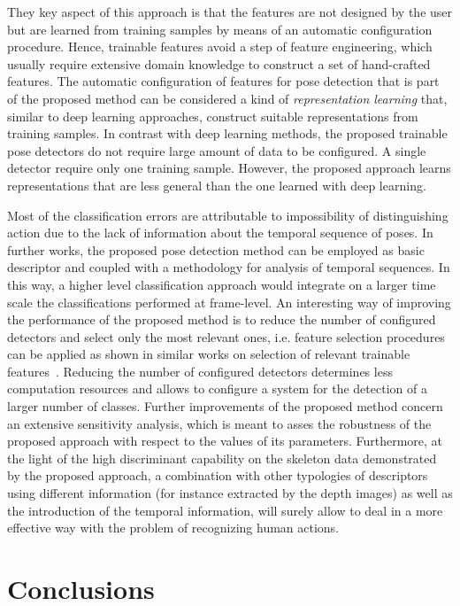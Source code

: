 \documentclass[runningheads,a4paper]{llncs}
\begin{document}
They key aspect of this approach is that the features are not designed by the user but are learned from training samples by means of an automatic configuration procedure. Hence, trainable features avoid a step of feature engineering, which usually require extensive domain knowledge to construct a set of hand-crafted features. The automatic configuration of features for pose detection that is part of the proposed method can be considered a kind of \emph{representation learning} that, similar to deep learning approaches, construct suitable representations from training samples.
In contrast with deep learning methods, the proposed trainable pose detectors do not require large amount of data to be configured. A single detector require only one training sample. However, the proposed approach learns representations that are less general than the one learned with deep learning.

Most of the classification errors are attributable to impossibility of distinguishing action due to the lack of information about the temporal sequence of poses. In further works, the proposed pose detection method can be employed as basic descriptor and coupled with a methodology for analysis of temporal sequences. In this way, a higher level classification approach would integrate on a larger time scale the classifications performed at frame-level.
An interesting way of improving the performance of the proposed method is to reduce the number of configured detectors and select only the most relevant ones, i.e. feature selection procedures can be applied as shown in similar works on selection of relevant trainable features~\cite{Strisciuglio15,Strisciuglio2016}. Reducing the number of configured detectors determines less computation resources and allows to configure a system for the detection of a larger number of classes.
Further improvements of the proposed method concern an extensive sensitivity analysis, which is meant to asses the robustness of the proposed approach with respect to the values of its  parameters. Furthermore, at the light of the high discriminant capability on the skeleton data demonstrated by the proposed approach, a combination with other typologies of descriptors using different information (for instance extracted by the depth images) as well as the introduction of the temporal information, will surely allow to deal in a more effective way with the problem of recognizing human actions.






\section{Conclusions}
\label{sec:concl}
\end{document}
